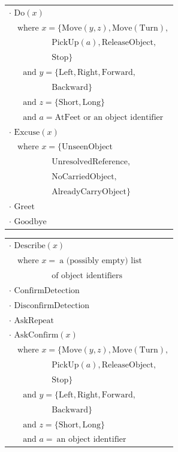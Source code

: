 \begin{table}[p!]
\begin{footnotesize}
\begin{tabular}{p{60mm}} 
$\cdot$ $\mathrm{Do}(x) $ \\ $ \ \ \ \text{ where } x=\{\mathrm{Move}(y,z), \mathrm{Move(Turn)},$ \\ $\ \ \ \ \ \ \ \ \ \ \ \ \ \ \ \ \ \ \ \ \ \ \ \mathrm{PickUp}(a),  \mathrm{ReleaseObject},$ \\ $\ \ \ \ \ \ \ \ \ \ \ \ \ \ \ \ \ \ \ \ \ \ \ \mathrm{Stop}\} $ \\ $ \ \ \ \ \ \ \text{ and } y = \{\mathrm{Left,Right,Forward,}$ \\ $ \ \ \ \ \ \ \ \ \ \ \ \ \ \ \ \ \ \ \ \ \ \ \ \mathrm{Backward}\} $ \\ $ \ \ \ \ \ \ \text{ and } z = \{\mathrm{Short,Long}\}$ \\ $ \ \ \ \ \ \  \text{ and } a =    \mathrm{AtFeet} \text{ or  an object identifier}$ \\
$\cdot$ $\mathrm{Excuse}(x) $ \\ $ \ \ \  \text{ where } x = \{\mathrm{UnseenObject}$ \\ $\ \ \ \ \ \ \ \ \ \ \ \ \ \ \ \ \ \ \ \ \ \ \ \mathrm{UnresolvedReference},$  \\ $\ \ \ \ \ \ \ \ \ \ \ \ \ \ \ \ \ \ \ \ \ \ \ \mathrm{NoCarriedObject,}$ \\ $\ \ \ \ \ \ \ \ \ \ \ \ \ \ \ \ \ \ \ \ \ \ \ \mathrm{AlreadyCarryObject}\}$ \\
$\cdot$ $\mathrm{Greet}$ \\
$\cdot$ $\mathrm{Goodbye}$ 
\end{tabular}
\hspace{2cm}
\begin{tabular}{p{60mm}} 
$\cdot$ $\mathrm{Describe}(x) $ \\ $ \ \ \  \text{ where } x = \ \text{a (possibly empty) list}$ \\ $ \ \ \ \ \ \ \ \ \ \ \ \ \ \ \ \ \ \ \ \ \ \ \  \text{of object identifiers}$ \\
$\cdot$ $\mathrm{ConfirmDetection}$ \\
$\cdot$ $\mathrm{DisconfirmDetection}$  \\
$\cdot$ $\mathrm{AskRepeat}$ \\
$\cdot$ $\mathrm{AskConfirm}(x) $\\ $ \ \ \ \text{ where } x=\{\mathrm{Move}(y,z), \mathrm{Move(Turn)},$ \\ $\ \ \ \ \ \ \ \ \ \ \ \ \ \ \ \ \ \ \ \ \ \ \ \mathrm{PickUp}(a),  \mathrm{ReleaseObject},$ \\ $\ \ \ \ \ \ \ \ \ \ \ \ \ \ \ \ \ \ \ \ \ \ \ \mathrm{Stop}\} $ \\ $ \ \ \ \ \ \ \text{ and } y = \{\mathrm{Left,Right,Forward,}$ \\ $ \ \ \ \ \ \ \ \ \ \ \ \ \ \ \ \ \ \ \ \ \ \ \ \mathrm{Backward}\} $ \\ $ \ \ \ \ \ \ \text{ and } z = \{\mathrm{Short,Long}\}$ \\ $ \ \ \ \ \ \  \text{ and } a = \ \text{an object identifier}$ \end{tabular}

\end{footnotesize}
\end{table}
